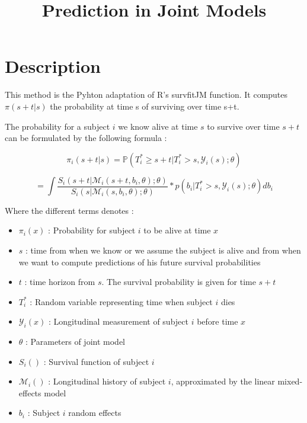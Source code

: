 \documentclass[11pt, oneside]{article}   	%
\title{Prediction in Joint Models}
\date{}							%
\providecommand{\tightlist}{%
      \setlength{\itemsep}{0pt}\setlength{\parskip}{0pt}}
\begin{document}
\maketitle









\section{Description}\label{description}

This method is the Pyhton adaptation of R's survfitJM function. It
computes \(\pi(s+t | s)\) the probability at time s of surviving over
time s+t.

The probability for a subject \(i\) we know alive at time \(s\) to
survive over time \(s+t\) can be formulated by the following formula :

\[
    \pi_i(s+t | s) = \mathbb{P}(T_i^* \geq s+t | T_i^* > s, \mathcal{Y}_i(s); \theta)
\]

\[
= \int
        \frac
            {S_i(s+t | \mathcal{M}_i(s+t, b_i, \theta); \theta)}
            {S_i(s | \mathcal{M}_i(s, b_i, \theta); \theta)}
        * p(b_i | T_i^* > s, \mathcal{Y}_i(s); \theta) db_i
\]

Where the different terms denotes :

\begin{itemize}
\tightlist
\item
  \(\pi_i(x)\) : Probability for subject \(i\) to be alive at time \(x\)
\item
  \(s\) : time from when we know or we assume the subject is alive and
  from when we want to compute predictions of his future survival
  probabilities
\item
  \(t\) : time horizon from \(s\). The survival probability is given for
  time \(s+t\)
\item
  \(T_i^*\) : Random variable representing time when subject \(i\) dies
\item
  \(\mathcal{Y}_i(x)\) : Longitudinal measurement of subject \(i\)
  before time \(x\)
\item
  \(\theta\) : Parameters of joint model
\item
  \(S_i()\) : Survival function of subject \(i\)
\item
  \(\mathcal{M}_i()\) : Longitudinal history of subject \(i\),
  approximated by the linear mixed-effects model
\item
  \(b_i\) : Subject \(i\) random effects
\end{itemize}
\end{document}

